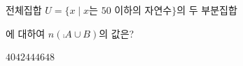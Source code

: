 전체집합 $U=\{x \mid x$는 $50$ 이하의 자연수$\}$의 두 부분집합 \par\smallskip{}\par\smallskip\noindent 에 대하여 $n(\comp{A}\cup B)$의 값은?
\begin{choices32}{$40$}{$42$}{$44$}{$46$}{$48$}\end{choices32}
